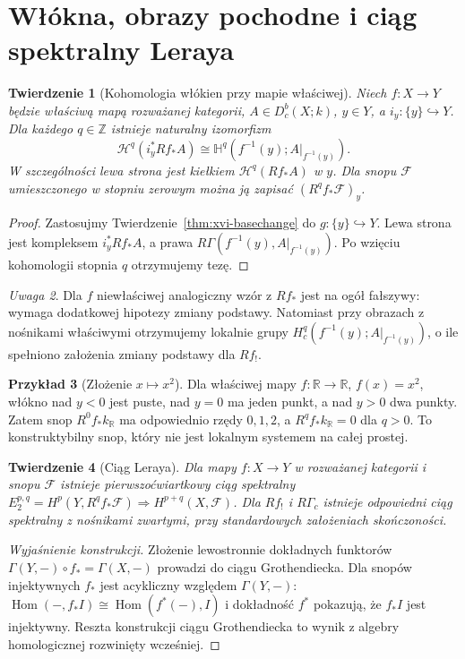\documentclass[11pt,a4paper,oneside]{report}
\newcommand{\R}{\mathbb{R}}
\newcommand{\Z}{\mathbb{Z}}
\theoremstyle{plain}
\newtheorem{twierdzenie}{Twierdzenie}[section]
\theoremstyle{definition}
\newtheorem{przyklad}[twierdzenie]{Przykład}
\theoremstyle{remark}
\newtheorem{uwaga}[twierdzenie]{Uwaga}
\begin{document}
\section{Włókna, obrazy pochodne i ciąg spektralny Leraya}
\begin{twierdzenie}[Kohomologia włókien przy mapie właściwej]
Niech $f:X\to Y$ będzie właściwą mapą rozważanej kategorii,
$A\in D^b_c(X;k)$, $y\in Y$, a $i_y:\{y\}\hookrightarrow Y$.
Dla każdego $q\in\Z$ istnieje naturalny izomorfizm
\[
\mathcal H^q(i_y^*Rf_*A)
\cong\mathbb H^q(f^{-1}(y);A|_{f^{-1}(y)}).
\]
W szczególności lewa strona jest kiełkiem
$\mathcal H^q(Rf_*A)$ w $y$. Dla snopu $\mathcal F$
umieszczonego w stopniu zerowym można ją zapisać
$(R^qf_*\mathcal F)_y$.
\end{twierdzenie}
\begin{proof}
Zastosujmy Twierdzenie~\ref{thm:xvi-basechange} do
$g:\{y\}\hookrightarrow Y$. Lewa strona jest
kompleksem $i_y^*Rf_*A$, a prawa
$R\Gamma(f^{-1}(y),A|_{f^{-1}(y)})$.
Po wzięciu kohomologii stopnia $q$ otrzymujemy tezę.
\end{proof}
\begin{uwaga}
Dla $f$ niewłaściwej analogiczny wzór z $Rf_*$ jest na ogół
fałszywy: wymaga dodatkowej hipotezy zmiany podstawy. Natomiast przy obrazach z nośnikami właściwymi
otrzymujemy lokalnie grupy $H_c^q(f^{-1}(y);A|_{f^{-1}(y)})$,
o ile spełniono założenia zmiany podstawy dla $Rf_!$.
\end{uwaga}
\begin{przyklad}[Złożenie $x\mapsto x^2$]
Dla właściwej mapy $f:\R\to\R$, $f(x)=x^2$, włókno
nad $y<0$ jest puste, nad $y=0$ ma jeden punkt, a nad
$y>0$ dwa punkty. Zatem snop $R^0f_*k_\R$ ma
odpowiednio rzędy $0,1,2$, a $R^qf_*k_\R=0$ dla $q>0$.
To konstruktybilny snop, który nie jest lokalnym systemem
na całej prostej.
\end{przyklad}
\begin{twierdzenie}[Ciąg Leraya]
Dla mapy $f:X\to Y$ w rozważanej kategorii i snopu
$\mathcal F$ istnieje pierwszoćwiartkowy ciąg spektralny
$E_2^{p,q}=H^p(Y,R^qf_*\mathcal F)
\Longrightarrow H^{p+q}(X,\mathcal F)$.
Dla $Rf_!$ i $R\Gamma_c$ istnieje odpowiedni ciąg
spektralny z nośnikami zwartymi, przy standardowych
założeniach skończoności.
\end{twierdzenie}
\begin{proof}[Wyjaśnienie konstrukcji]
Złożenie lewostronnie dokładnych funktorów
$\Gamma(Y,-)\circ f_*=\Gamma(X,-)$ prowadzi do
ciągu Grothendiecka. Dla snopów injektywnych
$f_*$ jest acykliczny względem $\Gamma(Y,-)$:
$\operatorname{Hom}(-,f_*I)\cong
\operatorname{Hom}(f^*(-),I)$ i dokładność $f^*$
pokazują, że $f_*I$ jest injektywny.
Reszta konstrukcji ciągu Grothendiecka to wynik
z algebry homologicznej rozwinięty wcześniej.
\end{proof}
\end{document}
